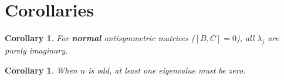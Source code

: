 \documentclass[aps,preprint]{revtex4}
\newtheorem{corollary}[theorem]{Corollary}
\begin{document}
\section*{Corollaries}

\begin{corollary}
For \textbf{normal} antisymmetric matrices ($[B,C]=0$), all $\lambda _{j}$
are purely imaginary.
\end{corollary}

\begin{corollary}
When $n$ is odd, at least one eigenvalue must be zero.
\end{corollary}
\end{document}
